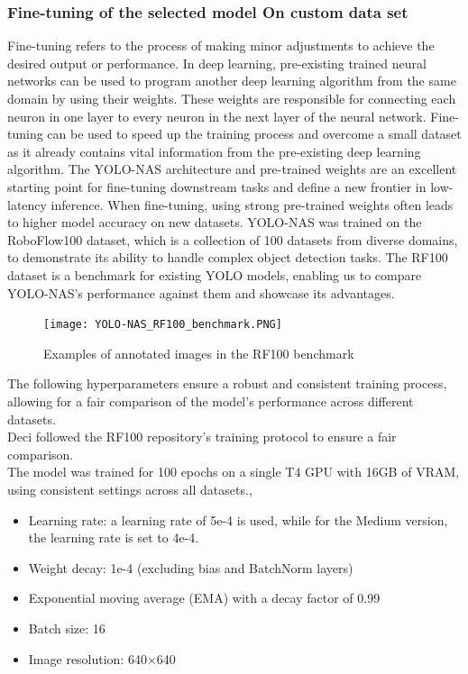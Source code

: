 \subsubsection{Fine-tuning of the selected model On custom data set}
Fine-tuning refers to the process of making minor adjustments to achieve the desired output or performance. In deep learning, pre-existing trained neural networks can be used to program another deep learning algorithm from the same domain by using their weights. These weights are responsible for connecting each neuron in one layer to every neuron in the next layer of the neural network. Fine-tuning can be used to speed up the training process and overcome a small dataset as it already contains vital information from the pre-existing deep learning algorithm. The YOLO-NAS architecture and pre-trained weights are an excellent starting point for fine-tuning downstream tasks and define a new frontier in low-latency inference. When fine-tuning, using strong pre-trained weights often leads to higher model accuracy on new datasets. YOLO-NAS was trained on the RoboFlow100 dataset, which is a collection of 100 datasets from diverse domains, to demonstrate its ability to handle complex object detection tasks. The RF100 dataset is a benchmark for existing YOLO models, enabling us to compare YOLO-NAS's performance against them and showcase its advantages.\cite{YOLO-NAS}
\begin{figure}[H]
    \centering
    \texttt{[image: YOLO-NAS\_RF100\_benchmark.PNG]}
    \caption{Examples of annotated images in the RF100 benchmark \cite{YOLO-NAS}}
    \label{fig:YOLO-NAS_RF100_benchmark}
\end{figure}
The following hyperparameters ensure a robust and consistent training process, allowing for a fair comparison of the model’s performance across different datasets.\\
Deci followed the RF100 repository’s training protocol to ensure a fair comparison.\\
The model was trained for 100 epochs on a single T4 GPU with 16GB of VRAM, using consistent settings across all datasets.\cite{YOLO-NAS}, \cite{yolo-nas-vs-yolov8}
\begin{itemize}
    \item Learning rate: a learning rate of 5e-4 is used, while for the Medium version, the learning rate is set to 4e-4.
    \item Weight decay: 1e-4 (excluding bias and BatchNorm layers)
    \item Exponential moving average (EMA) with a decay factor of 0.99
    \item Batch size: 16
    \item Image resolution: 640×640
\end{itemize}


